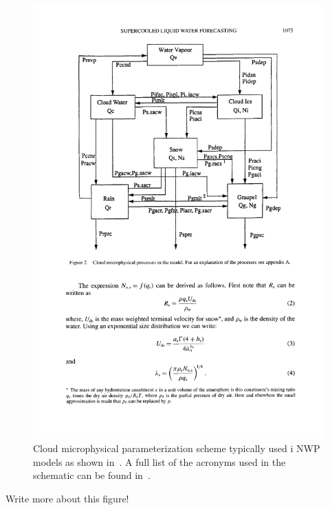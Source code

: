 \begin{figure}
\centering
\includegraphics[scale=0.8]{microphysics.pdf}
\caption{Cloud microphysical parameterization scheme typically used i NWP models as shown in~\cite{Reisner1998}. A full list of the acronyms used in the schematic can be found in~\cite{Reisner1998}.}
\label{fig:microphysics}
\end{figure}

Write more about this figure!

